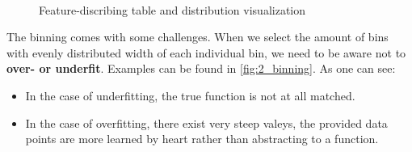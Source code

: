 \begin{figure}[H]
  \centering
  \\\vspace*{0.25cm}
  \caption{Feature-discribing table and distribution visualization}
  \label{fig:2_distr_visualization}
\end{figure}

The binning comes with some challenges. When we select the amount of bins with evenly distributed width of each individual bin, we need to be aware not to \textbf{over- or underfit}. Examples can be found in \ref{fig:2_binning}. As one can see:
\begin{itemize}
  \item In the case of underfitting, the true function is not at all matched.
  \item In the case of overfitting, there exist very steep valeys, the provided data points are more learned by heart rather than abstracting to a function.
\end{itemize}

